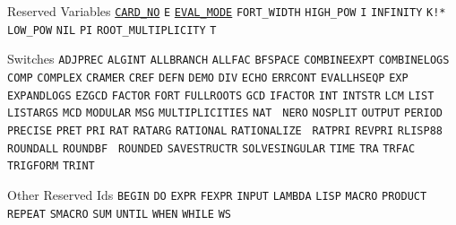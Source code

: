 \begin{list}{}
\item[Reserved Variables] \hyperlink{CARD_NO}{\texttt{CARD\_NO}} {\texttt{E}}
\hyperlink{target:modes}{\tt EVAL\_MODE}
{\tt FORT\_WIDTH} {\tt HIGH\_POW} {\texttt{I}} {\texttt{INFINITY}} {\texttt{K!*}} {\tt LOW\_POW} {\texttt{NIL}} {\texttt{PI}} {\tt ROOT\_MULTIPLICITY} {\texttt{T}}

\item[Switches] {\texttt{ADJPREC}} {\texttt{ALGINT}} {\texttt{ALLBRANCH}} {\texttt{ALLFAC}}
{\texttt{BFSPACE}} {\texttt{COMBINEEXPT}} {\texttt{COMBINELOGS}}
{\texttt{COMP}} {\texttt{COMPLEX}} {\texttt{CRAMER}} {\texttt{CREF}} {\texttt{DEFN}} {\texttt{DEMO}}
{\texttt{DIV}} {\texttt{ECHO}} {\texttt{ERRCONT}} {\texttt{EVALLHSEQP}} {\texttt{EXP}} {\tt
EXPANDLOGS} {\texttt{EZGCD}} {\texttt{FACTOR}} {\texttt{FORT}} {\texttt{FULLROOTS}} {\texttt{GCD}}
{\texttt{IFACTOR}} {\texttt{INT}} {\texttt{INTSTR}} {\texttt{LCM}} {\texttt{LIST}} {\texttt{LISTARGS}}
{\texttt{MCD}} {\texttt{MODULAR}} {\texttt{MSG}} {\texttt{MULTIPLICITIES}} {\texttt{NAT}} {\tt
NERO} {\texttt{NOSPLIT}} {\texttt{OUTPUT}} {\texttt{PERIOD}} {\texttt{PRECISE}} {\texttt{PRET}}
{\texttt{PRI}} {\texttt{RAT}} {\texttt{RATARG}} {\texttt{RATIONAL}} {\texttt{RATIONALIZE}} {\tt
RATPRI} {\texttt{REVPRI}} {\texttt{RLISP88}} {\texttt{ROUNDALL}} {\texttt{ROUNDBF}} {\tt
ROUNDED} {\texttt{SAVESTRUCTR}} {\texttt{SOLVESINGULAR}} {\texttt{TIME}} {\texttt{TRA}}
{\texttt{TRFAC}} {\texttt{TRIGFORM}} {\texttt{TRINT}}

\item[Other Reserved Ids] {\texttt{BEGIN}} {\texttt{DO}}
{\texttt{EXPR}} {\texttt{FEXPR}} {\texttt{INPUT}} {\texttt{LAMBDA}}
{\texttt{LISP}} {\texttt{MACRO}} {\texttt{PRODUCT}} {\texttt{REPEAT}}
{\texttt{SMACRO}} {\texttt{SUM}} {\texttt{UNTIL}} {\texttt{WHEN}} {\texttt{WHILE}} {\texttt{WS}}

\end{list}

